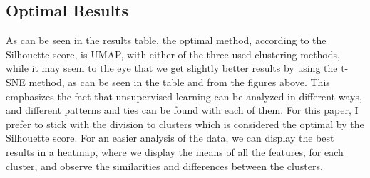 \documentclass{article}
\begin{document}
\subsection{Optimal Results}
As can be seen in the results table, the optimal method, according to the Silhouette score, is UMAP, with either of the three used clustering methods, while it may seem to the eye that we get slightly better results by using the t-SNE method, as can be seen in the table and from the figures above. This emphasizes the fact that unsupervised learning can be analyzed in different ways, and different patterns and ties can be found with each of them. For this paper, I prefer to stick with the division to clusters which is considered the optimal by the Silhouette score.
For an easier analysis of the data, we can display the best results in a heatmap, where we display the means of all the features, for each cluster, and observe the similarities and differences between the clusters.

\begin{figure}[H]
    \centering
\end{figure}
\end{document}
